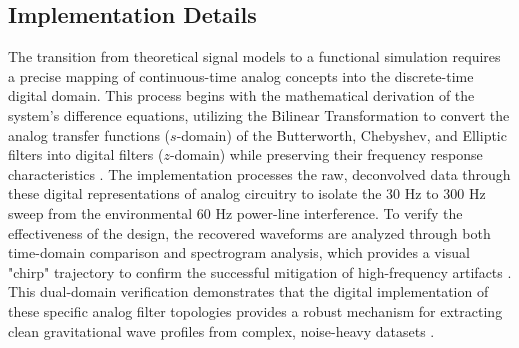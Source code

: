 \subsection{Implementation Details}

The transition from theoretical signal models to a functional simulation requires a precise mapping of continuous-time analog concepts into the discrete-time digital domain. This process begins with the mathematical derivation of the system's difference equations, utilizing the Bilinear Transformation to convert the analog transfer functions ($s$-domain) of the Butterworth, Chebyshev, and Elliptic filters into digital filters ($z$-domain) while preserving their frequency response characteristics \cite{4}. The implementation processes the raw, deconvolved data through these digital representations of analog circuitry to isolate the 30 Hz to 300 Hz sweep from the environmental 60 Hz power-line interference. To verify the effectiveness of the design, the recovered waveforms are analyzed through both time-domain comparison and spectrogram analysis, which provides a visual "chirp" trajectory to confirm the successful mitigation of high-frequency artifacts \cite{5}. This dual-domain verification demonstrates that the digital implementation of these specific analog filter topologies provides a robust mechanism for extracting clean gravitational wave profiles from complex, noise-heavy datasets \cite{4}.